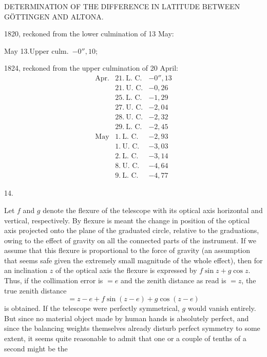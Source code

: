 \clearpage
\noindent{}\parbox[t]{\dimexpr\textwidth-10mm\relax}{\centering\scriptsize DETERMINATION OF THE DIFFERENCE IN LATITUDE BETWEEN GÖTTINGEN AND ALTONA.}\par
1820, reckoned from the lower culmination of 13 May:
\begin{center}May 13.\quad Upper culm.\ $-0''{,}10$;\end{center}
1824, reckoned from the upper culmination of 20 April:
\[
\begin{array}{rl|r}
\text{Apr.}&21.\ \text{L. C.}&-0''{,}13\\
&21.\ \text{U. C.}&-0{,}26\\
&25.\ \text{L. C.}&-1{,}29\\
&27.\ \text{U. C.}&-2{,}04\\
&28.\ \text{U. C.}&-2{,}32\\
&29.\ \text{L. C.}&-2{,}45\\
\text{May}&1.\ \text{L. C.}&-2{,}93\\
&1.\ \text{U. C.}&-3{,}03\\
&2.\ \text{L. C.}&-3{,}14\\
&8.\ \text{U. C.}&-4{,}64\\
&9.\ \text{L. C.}&-4{,}77
\end{array}
\]
\begin{center}14.\end{center}
Let $f$ and $g$ denote the flexure of the telescope with its optical axis horizontal and vertical, respectively. By flexure is meant the change in position of the optical axis projected onto the plane of the graduated circle, relative to the graduations, owing to the effect of gravity on all the connected parts of the instrument. If we assume that this flexure is proportional to the force of gravity (an assumption that seems safe given the extremely small magnitude of the whole effect), then for an inclination $z$ of the optical axis the flexure is expressed by $f\sin z+g\cos z$. Thus, if the collimation error is $=e$ and the zenith distance as read is $=z$, the true zenith distance
\[
=z-e+f\sin(z-e)+g\cos(z-e)
\]
is obtained. If the telescope were perfectly symmetrical, $g$ would vanish entirely. But since no material object made by human hands is absolutely perfect, and since the balancing weights themselves already disturb perfect symmetry to some extent, it seems quite reasonable to admit that one or a couple of tenths of a second might be the

